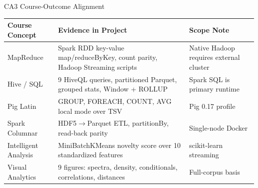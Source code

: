 \documentclass[aspectratio=169]{beamer}
\begin{document}
\begin{frame}{CA3 Course-Outcome Alignment}
  \tiny
  \begin{tabularx}{\textwidth}{p{2.6cm} X p{3.2cm}}
    \toprule
    \rowcolor{MD3SurfaceContainer}
    \textbf{Course Concept} & \textbf{Evidence in Project} & \textbf{Scope Note} \\
    \midrule
    MapReduce & Spark RDD key-value map/reduceByKey, count parity, Hadoop Streaming scripts & Native Hadoop requires external cluster \\
    Hive / SQL & 9 HiveQL queries, partitioned Parquet, grouped stats, Window + ROLLUP & Spark SQL is primary runtime \\
    Pig Latin & GROUP, FOREACH, COUNT, AVG local mode over TSV & Pig 0.17 profile \\
    Spark Columnar & HDF5$\to$Parquet ETL, partitionBy, read-back parity & Single-node Docker \\
    Intelligent Analysis & MiniBatchKMeans novelty score over 10 standardized features & scikit-learn streaming \\
    Visual Analytics & 9 figures: spectra, density, conditionals, correlations, distances & Full-corpus basis \\
    \bottomrule
  \end{tabularx}
\end{frame}
\end{document}
